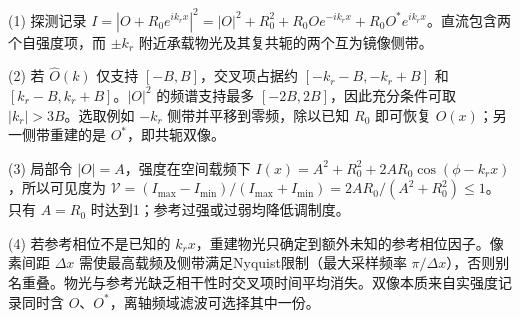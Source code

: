 (1) 探测记录 \(I=|O+R_0e^{ik_rx}|^2=|O|^2+R_0^2+R_0Oe^{-ik_rx}+R_0O^*e^{ik_rx}\)。直流包含两个自强度项，而 \(\pm k_r\) 附近承载物光及其复共轭的两个互为镜像侧带。

(2) 若 \(\widehat O(k)\) 仅支持 \([-B,B]\)，交叉项占据约 \([-k_r-B,-k_r+B]\) 和 \([k_r-B,k_r+B]\)。\(|O|^2\) 的频谱支持最多 \([-2B,2B]\)，因此充分条件可取 \(|k_r|>3B\)。选取例如 \(-k_r\) 侧带并平移到零频，除以已知 \(R_0\) 即可恢复 \(O(x)\)；另一侧带重建的是 \(O^*\)，即共轭双像。

(3) 局部令 \(|O|=A\)，强度在空间载频下 \(I(x)=A^2+R_0^2+2AR_0\cos(\phi-k_rx)\)，所以可见度为 \(\mathcal V=(I_{\max}-I_{\min})/(I_{\max}+I_{\min})=2AR_0/(A^2+R_0^2)\le1\)。只有 \(A=R_0\) 时达到1；参考过强或过弱均降低调制度。

(4) 若参考相位不是已知的 \(k_rx\)，重建物光只确定到额外未知的参考相位因子。像素间距 \(\Delta x\) 需使最高载频及侧带满足Nyquist限制（最大采样频率 \(\pi/\Delta x\)），否则别名重叠。物光与参考光缺乏相干性时交叉项时间平均消失。双像本质来自实强度记录同时含 \(O\)、\(O^*\)，离轴频域滤波可选择其中一份。
